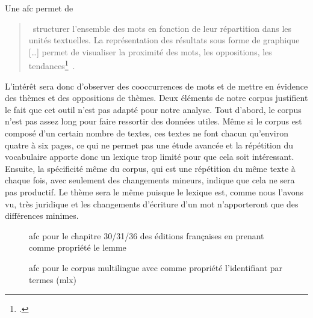 Une \acrfull{afc} permet de 
\begin{quotation}
 \og~structurer l'ensemble des mots en fonction de leur répartition dans les unités textuelles. La représentation des résultats sous forme de graphique [\dots] permet de visualiser la proximité des mots, les oppositions, les tendances\footcite[p.~19]{stat_text_garnier}~\fg{}.
\end{quotation}
 L'intérêt sera donc d'observer des cooccurrences de mots et de mettre en évidence des thèmes et des oppositions de thèmes. Deux éléments de notre corpus justifient le fait que cet outil n'est pas adapté pour notre analyse. Tout d'abord, le corpus n'est pas assez long pour faire ressortir des données utiles. Même si le corpus est composé d'un certain nombre de textes, ces textes ne font chacun qu'environ quatre à six pages, ce qui ne permet pas une étude avancée et la répétition du vocabulaire apporte donc un lexique trop limité pour que cela soit intéressant. Ensuite, la spécificité même du corpus, qui est une répétition du même texte à chaque fois, avec seulement des changements mineurs, indique que cela ne sera pas productif. Le thème sera le même puisque le lexique est, comme nous l'avons vu, très juridique et les changements d'écriture d'un mot n'apporteront que des différences minimes.
\begin{figure}[p]
    \centering
    \caption{\acrshort{afc} pour le chapitre 30/31/36 des éditions françaises en prenant comme propriété le lemme}
    \label{fig:afc_fr}
\end{figure}
\begin{figure}[p]
    \centering
    \caption{\acrshort{afc} pour le corpus multilingue avec comme propriété l'identifiant par termes (mlx)}
    \label{fig:afc_mlx}
\end{figure}
